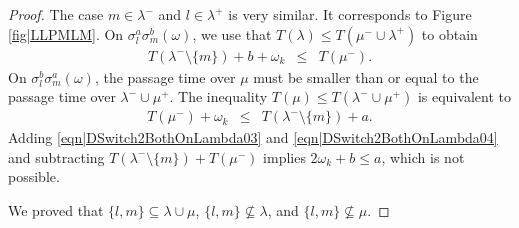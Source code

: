 \documentclass[reqno]{amsart}
\begin{document}
\begin{proof}
The case $m\in \lambda^-$ and $l\in\lambda^+$ is very similar. It corresponds to Figure \ref{fig|LLPMLM}.
On $\sigma_l^a\sigma_m^b(\omega)$, we use that $T(\lambda)\leq T(\mu^-\cup \lambda^+)$ to obtain 
\begin{eqnarray}
T(\lambda^-\setminus\{m\})+b+\omega_k&\leq& T(\mu^-). \label{eqn|DSwitch2BothOnLambda03}
\end{eqnarray}
On $\sigma_l^b\sigma_m^a(\omega)$, the passage time over $\mu$ must be smaller than or equal to the passage time over $\lambda^-\cup \mu^+$. The inequality 
$T(\mu)\leq T(\lambda^-\cup \mu^+)$ is equivalent to 
\begin{eqnarray}
T(\mu^-)+\omega_k&\leq& T(\lambda^-\setminus\{m\})+a. \label{eqn|DSwitch2BothOnLambda04}
\end{eqnarray}
Adding \eqref{eqn|DSwitch2BothOnLambda03} and \eqref{eqn|DSwitch2BothOnLambda04} and subtracting $ T(\lambda^-\setminus\{m\})+T(\mu^-)$ implies
$2\omega_k+b\leq a$, which is not possible.

 
We proved that $\{l,m\}\subseteq \lambda\cup \mu$, $\{l,m\}\not\subseteq\lambda$, and $\{l,m\}\not\subseteq \mu$.



\end{proof}
\end{document}
